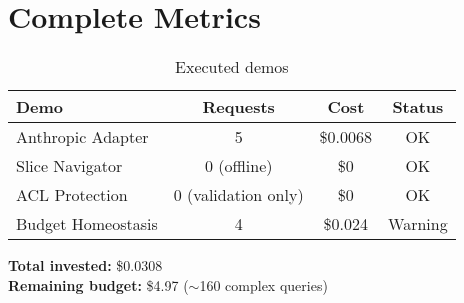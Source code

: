 \documentclass[11pt]{article}
\begin{document}
\section{Complete Metrics}

\begin{table}[H]
\centering
\begin{tabular}{@{}lccc@{}}
\toprule
\textbf{Demo} & \textbf{Requests} & \textbf{Cost} & \textbf{Status} \\ \midrule
Anthropic Adapter & 5 & \$0.0068 & OK \\
Slice Navigator & 0 (offline) & \$0 & OK \\
ACL Protection & 0 (validation only) & \$0 & OK \\
Budget Homeostasis & 4 & \$0.024 & Warning \\ \bottomrule
\end{tabular}
\caption{Executed demos}
\end{table}

\textbf{Total invested:} \$0.0308\\
\textbf{Remaining budget:} \$4.97 ($\sim$160 complex queries)
\end{document}
